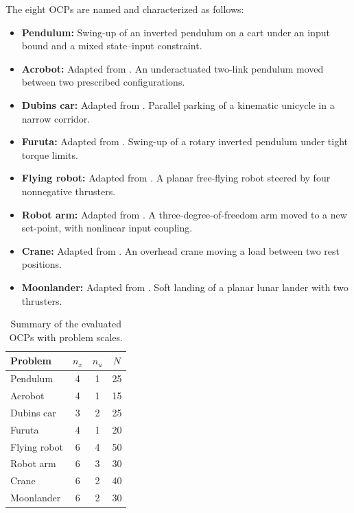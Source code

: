 \documentclass[class=scrbook, crop=false]{standalone}
\begin{document}
The eight \glspl{OCP} are named and characterized as follows:
\begin{itemize}
    \item \textbf{Pendulum:} Swing-up of an inverted pendulum on a cart under an input bound and a mixed state--input constraint.
    \item \textbf{Acrobot:} Adapted from \cite{spong1995swing}.
    An underactuated two-link pendulum moved between two prescribed configurations.
    \item \textbf{Dubins car:} Adapted from \cite{dubins1957curves}.
    Parallel parking of a kinematic unicycle in a narrow corridor.
    \item \textbf{Furuta:} Adapted from \cite{furuta1992swing}.
    Swing-up of a rotary inverted pendulum under tight torque limits.
    \item \textbf{Flying robot:} Adapted from \cite{betts2010practical}.
    A planar free-flying robot steered by four nonnegative thrusters.
    \item \textbf{Robot arm:} Adapted from \cite{betts2010practical}.
    A three-degree-of-freedom arm moved to a new set-point, with nonlinear input coupling.
    \item \textbf{Crane:} Adapted from \cite{betts2010practical}.
    An overhead crane moving a load between two rest positions.
    \item \textbf{Moonlander:} Adapted from \cite{meditch1964optimal}.
    Soft landing of a planar lunar lander with two thrusters.
\end{itemize}

\begin{table}[htbp]
    \centering
    \caption{Summary of the evaluated \glspl{OCP} with problem scales.}
    \label{tab:ocp_problems}
    \begin{tabular}{l ccc}
        \toprule
        \textbf{Problem} & $n_x$ & $n_u$ & $N$ \\
        \midrule
        Pendulum     & 4 & 1 & 25 \\
        Acrobot      & 4 & 1 & 15 \\
        Dubins car   & 3 & 2 & 25 \\
        Furuta       & 4 & 1 & 20 \\
        Flying robot & 6 & 4 & 50 \\
        Robot arm    & 6 & 3 & 30 \\
        Crane        & 6 & 2 & 40 \\
        Moonlander   & 6 & 2 & 30 \\
        \bottomrule
    \end{tabular}
\end{table}
\end{document}
